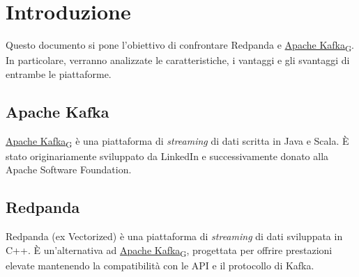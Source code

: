 \section{Introduzione}
Questo documento si pone l'obiettivo di confrontare Redpanda e \href{https://7last.github.io/docs/rtb/documentazione-interna/glossario#apache-kafka}{Apache Kafka\textsubscript{G}}.
In particolare, verranno analizzate le caratteristiche, i vantaggi e gli svantaggi di entrambe le piattaforme.\\

\subsection{Apache Kafka}
\href{https://7last.github.io/docs/rtb/documentazione-interna/glossario#apache-kafka}{Apache Kafka\textsubscript{G}} è una piattaforma di \textit{streaming} di dati scritta in Java e Scala.
È stato originariamente sviluppato da LinkedIn e successivamente donato alla Apache Software Foundation.

\subsection{Redpanda}
Redpanda (ex Vectorized) è una piattaforma di \textit{streaming} di dati sviluppata in C++.
È un'alternativa ad \href{https://7last.github.io/docs/rtb/documentazione-interna/glossario#apache-kafka}{Apache Kafka\textsubscript{G}}, progettata per offrire prestazioni elevate
mantenendo la compatibilità con le API e il protocollo di Kafka.
